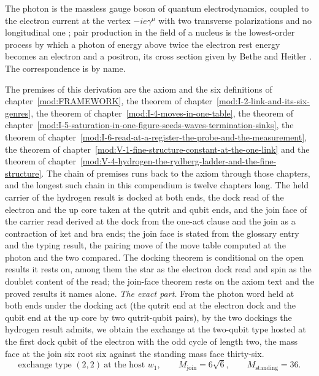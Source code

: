 \begin{chbridge}
The photon is the massless gauge boson of quantum electrodynamics, coupled to the electron current at the vertex $-ie\gamma^{\mu}$ with two transverse polarizations and no longitudinal one \cite{Peskin1995}; pair production in the field of a nucleus is the lowest-order process by which a photon of energy above twice the electron rest energy becomes an electron and a positron, its cross section given by Bethe and Heitler \cite{BetheHeitler1934}. The correspondence is by name.
\end{chbridge}
\begin{chproof}
The premises of this derivation are the axiom and the six definitions of chapter~\ref{mod:FRAMEWORK}, the theorem of chapter~\ref{mod:I-2-link-and-its-six-genres}, the theorem of chapter~\ref{mod:I-4-moves-in-one-table}, the theorem of chapter~\ref{mod:I-5-saturation-in-one-figure-seeds-waves-termination-sinks}, the theorem of chapter~\ref{mod:I-6-read-at-a-register-the-probe-and-the-measurement}, the theorem of chapter~\ref{mod:V-1-fine-structure-constant-at-the-one-link} and the theorem of chapter~\ref{mod:V-4-hydrogen-the-rydberg-ladder-and-the-fine-structure}. The chain of premises runs back to the axiom through those chapters, and the longest such chain in this compendium is twelve chapters long.
The held carrier of the hydrogen result is docked at both ends, the dock read of the electron and the up core taken at the qutrit and qubit ends, and the join face of the carrier read derived at the dock from the one-act clause and the join as a contraction of ket and bra ends; the join face is stated from the glossary entry and the typing result, the pairing move of the move table computed at the photon and the two compared. The docking theorem is conditional on the open results it rests on, among them the star as the electron dock read and spin as the doublet content of the read; the join-face theorem rests on the axiom text and the proved results it names alone.
\textit{The exact part.}
From the photon word held at both ends under the docking act (the qutrit end at the electron dock and the qubit end at the up core by two qutrit-qubit pairs), by the two dockings the hydrogen result admits, we obtain the exchange at the two-qubit type hosted at the first dock qubit of the electron with the odd cycle of length two, the mass face at the join six root six against the standing mass face thirty-six.
\begin{equation}
\text{exchange type } (2,2) \ \text{at the host } w_{1}, \qquad M_{\mathrm{join}} = 6\sqrt{6}, \qquad M_{\mathrm{standing}} = 36 .

\end{equation}
\end{chproof}
